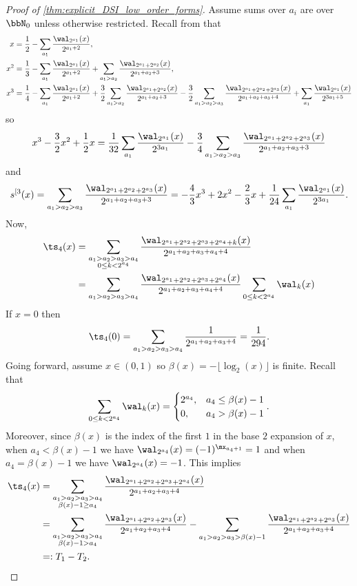 \documentclass[acmsmall]{acmart}
\begin{document}
\begin{proof}[Proof of \cref{thm:explicit_DSI_low_order_forms}]
    Assume sums over $a_i$ are over $\bbN_0$ unless otherwise restricted. Recall from  that
    \begin{align*}
        x &= \frac{1}{2} - \sum_{a_1} \frac{\wal_{2^{a_1}}(x)}{2^{a_1+2}}, \\
        x^2 &= \frac{1}{3} - \sum_{a_1}\frac{\wal_{2^{a_1}}(x)}{2^{a_1+2}} + \sum_{a_1>a_2} \frac{\wal_{2^{a_1}+2^{a_2}}(x)}{2^{a_1+a_2+3}}, \\
        x^3 &= \frac{1}{4} - \sum_{a_1} \frac{\wal_{2^{a_1}}(x)}{2^{a_1+2}} + \frac{3}{2}\sum_{a_1>a_2} \frac{\wal_{2^{a_1}+2^{a_2}}(x)}{2^{a_1+a_2+3}} - \frac{3}{2} \sum_{a_1>a_2>a_3} \frac{\wal_{2^{a_1}+2^{a_2}+2^{a_3}}(x)}{2^{a_1+a_2+a_3+4}} + \sum_{a_1} \frac{\wal_{2^{a_1}}(x)}{2^{3a_1+5}}
    \end{align*}
    so
    $$x^3-\frac{3}{2}x^2+\frac{1}{2}x = \frac{1}{32} \sum_{a_1} \frac{\wal_{2^{a_1}}(x)}{2^{3a_1}} - \frac{3}{4} \sum_{a_1>a_2>a_3} \frac{\wal_{2^{a_1}+2^{a_2}+2^{a_3}}(x)}{2^{a_1+a_2+a_3+3}}$$
    and 
    $$s^{[3}(x) = \sum_{a_1>a_2>a_3} \frac{\wal_{2^{a_1}+2^{a_2}+2^{a_3}}(x)}{2^{a_1+a_2+a_3+3}} = -\frac{4}{3} x^3+ 2x^2 -\frac{2}{3}x + \frac{1}{24} \sum_{a_1} \frac{\wal_{2^{a_1}}(x)}{2^{3a_1}}.$$
    Now,
    \begin{align*}
        \ts_4(x) &= \sum_{\substack{a_1>a_2>a_3>a_4 \\ 0 \leq k < 2^{a_4}}} \frac{\wal_{2^{a_1}+2^{a_2}+2^{a_3}+2^{a_4}+k}(x)}{2^{a_1+a_2+a_3+a_4+4}} \\
        &= \sum_{a_1>a_2>a_3>a_4} \frac{\wal_{2^{a_1}+2^{a_2}+2^{a_3}+2^{a_4}}(x)}{2^{a_1+a_2+a_3+a_4+4}} \sum_{0 \leq k < 2^{a_4}} \wal_k(x) \\
    \end{align*}
    If $x=0$ then 
    $$\ts_4(0) = \sum_{a_1 > a_2 > a_3 > a_4} \frac{1}{2^{a_1+a_2+a_3+4}} = \frac{1}{294}.$$ 
    Going forward, assume $x \in (0,1)$ so $\beta(x) = - \lfloor \log_2(x) \rfloor$ is finite. Recall that 
    $$\sum_{0 \leq k < 2^{a_4}} \wal_k(x) = \begin{cases} 2^{a_4}, & a_4 \leq \beta(x)-1 \\ 0, & a_4 > \beta(x)-1 \end{cases}.$$
    Moreover, since $\beta(x)$ is the index of the first $1$ in the base $2$ expansion of $x$, when $a_4 < \beta(x)-1$ we have $\wal_{2^{a_4}}(x) = (-1)^{\mx_{a_4+1}} = 1$ and when $a_4 = \beta(x)-1$ we have $\wal_{2^{a_4}}(x) = -1$. This implies 
    \begin{align*}
        \ts_4(x) &= \sum_{\substack{a_1>a_2>a_3>a_4 \\ \beta(x)-1 \geq a_4}} \frac{\wal_{2^{a_1}+2^{a_2}+2^{a_3}+2^{a_4}}(x)}{2^{a_1+a_2+a_3+4}} \\
        &= \sum_{\substack{a_1>a_2>a_3>a_4 \\ \beta(x)-1 > a_4}} \frac{\wal_{2^{a_1}+2^{a_2}+2^{a_3}}(x)}{2^{a_1+a_2+a_3+4}} - \sum_{a_1>a_2 > a_3 > \beta(x)-1} \frac{\wal_{2^{a_1}+2^{a_2}+2^{a_3}}(x)}{2^{a_1+a_2+a_3+4}} \\
        &=: T_1 - T_2.
    \end{align*}
    

\end{proof}
\end{document}
